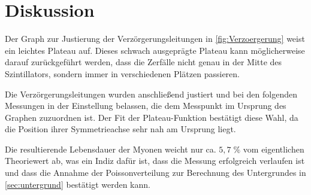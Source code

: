 \newpage
\section{Diskussion}
    Der Graph zur Justierung der Verzörgerungsleitungen in \autoref{fig:Verzoergerung} weist ein leichtes Plateau auf.
    Dieses schwach ausgeprägte Plateau kann möglicherweise darauf zurückgeführt werden, dass die Zerfälle nicht genau in der Mitte des Szintillators, sondern immer in verschiedenen Plätzen passieren.

    Die Verzörgerungsleitungen wurden anschließend justiert und bei den folgenden Messungen in der Einstellung belassen, die dem Messpunkt im Ursprung des Graphen zuzuordnen ist. Der Fit der Plateau-Funktion bestätigt diese Wahl, da die Position ihrer Symmetrieachse sehr nah am Ursprung liegt.

    Die resultierende Lebensdauer der Myonen weicht nur ca. $5,7 \;\%$ vom eigentlichen Theoriewert ab, was ein Indiz dafür ist, dass die Messung erfolgreich verlaufen ist und dass die Annahme der Poissonverteilung zur Berechnung des Untergrundes in \autoref{sec:untergrund} bestätigt werden kann.

    


